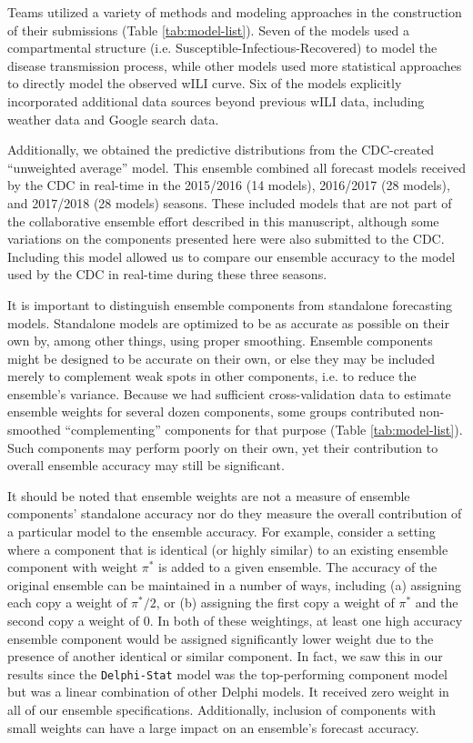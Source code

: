 \documentclass{article}\usepackage[]{graphicx}\usepackage[]{color}
\begin{document}
Teams utilized a variety of methods and modeling approaches in the construction of their submissions (Table \ref{tab:model-list}). Seven of the models used a compartmental structure (i.e. Susceptible-Infectious-Recovered) to model the disease transmission process, while other models used more statistical approaches to directly model the observed wILI curve. Six of the models explicitly incorporated additional data sources beyond previous wILI data, including weather data and Google search data.  

Additionally, we obtained the predictive distributions from the CDC-created ``unweighted average'' model. This ensemble combined all forecast models received by the CDC in real-time in the 2015/2016 (14 models), 2016/2017 (28 models), and 2017/2018 (28 models) seasons.\cite{McGowan2018} These included models that are not part of the collaborative ensemble effort described in this manuscript, although some variations on the components presented here were also submitted to the CDC. Including this model allowed us to compare our ensemble accuracy to the model used by the CDC in real-time during these three seasons.

It is important to distinguish ensemble components from standalone forecasting models.  
Standalone models are optimized to be as accurate as possible on their own by, among other things, using proper smoothing.
Ensemble components might be designed to be accurate on their own, or else they may be included merely to complement weak spots in other components, i.e. to reduce the ensemble's variance.  
Because we had sufficient cross-validation data to estimate ensemble weights for several dozen components, some groups contributed non-smoothed ``complementing'' components for that purpose (Table \ref{tab:model-list}).  
Such components may perform poorly on their own, yet their contribution to overall ensemble accuracy may still be significant.

It should be noted that ensemble weights are not a measure of ensemble components' standalone accuracy nor do they measure the overall contribution of a particular model to the ensemble accuracy.
For example, consider a setting where a component that is identical (or highly similar) to an existing ensemble component with weight $\pi^*$ is added to a given ensemble. 
The accuracy of the original ensemble can be maintained in a number of ways, including (a) assigning each copy a weight of $\pi^*/2$, or (b) assigning the first copy a weight of $\pi^*$ and the second copy a weight of $0$. 
In both of these weightings, at least one high accuracy ensemble component would be assigned significantly lower weight due to the presence of another identical or similar component.
In fact, we saw this in our results since the {\tt Delphi-Stat} model was the top-performing component model but was a linear combination of other Delphi models.
It received zero weight in all of our ensemble specifications.
Additionally, inclusion of components with small weights can have a large impact on an ensemble's forecast accuracy.
\end{document}
